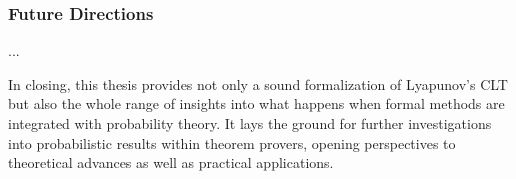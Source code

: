 \subsubsection{Future Directions}
...

In closing, this thesis provides not only a sound formalization of Lyapunov's CLT but also the whole range of insights into what happens when formal methods are integrated with probability theory. It lays the ground for further investigations into probabilistic results within theorem provers, opening perspectives to theoretical advances as well as practical applications.